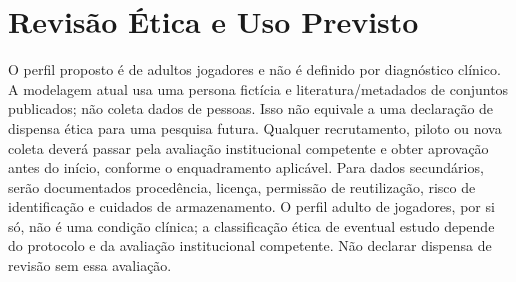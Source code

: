 \documentclass[conference]{IEEEtran}
\begin{document}
\section{Revisão Ética e Uso Previsto}

O perfil proposto é de adultos jogadores e não é definido por diagnóstico clínico. A modelagem atual usa uma persona fictícia e literatura/metadados de conjuntos publicados; não coleta dados de pessoas. Isso não equivale a uma declaração de dispensa ética para uma pesquisa futura. Qualquer recrutamento, piloto ou nova coleta deverá passar pela avaliação institucional competente e obter aprovação antes do início, conforme o enquadramento aplicável. Para dados secundários, serão documentados procedência, licença, permissão de reutilização, risco de identificação e cuidados de armazenamento. O perfil adulto de jogadores, por si só, não é uma condição clínica; a classificação ética de eventual estudo depende do protocolo e da avaliação institucional competente. Não declarar dispensa de revisão sem essa avaliação.

\end{document}
